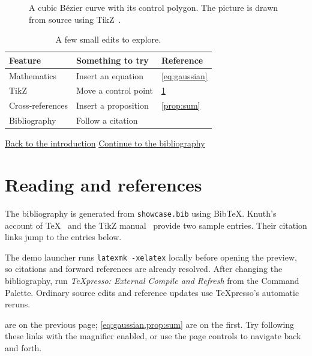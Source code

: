 \documentclass{article}
\begin{document}
\begin{figure}[ht]
\centering
{}
\caption{A cubic B\'ezier curve with its control polygon. The picture is drawn
from source using TikZ~\cite{tikz}.}\label{fig:curve}
\end{figure}

\begin{table}[ht]
\centering
\begin{tabular}{lll}
\toprule
Feature & Something to try & Reference \\
\midrule
Mathematics & Insert an equation & \cref{eq:gaussian} \\
TikZ & Move a control point & \cref{fig:curve} \\
Cross-references & Insert a proposition & \cref{prop:sum} \\
Bibliography & Follow a citation & \cite{knuth1984} \\
\bottomrule
\end{tabular}
\caption{A few small edits to explore.}\label{tab:checklist}
\end{table}

\noindent\hyperref[sec:start]{Back to the introduction}
\hfill\hyperref[sec:references]{Continue to the bibliography}

\newpage
\section{Reading and references}\label{sec:references}
The bibliography is generated from \texttt{showcase.bib} using BibTeX.
Knuth's account of \TeX~\cite{knuth1984} and the TikZ manual~\cite{tikz}
provide two sample entries. Their citation links jump to the entries below.

The demo launcher runs \texttt{latexmk -xelatex} locally before opening the
preview, so citations and forward references are already resolved.
After changing the bibliography, run
\emph{TeXpresso: External Compile and Refresh} from the Command Palette.
Ordinary source edits and reference updates use TeXpresso's automatic reruns.

 are on the previous page;
\cref{eq:gaussian,prop:sum} are on the first. Try following these links with the
magnifier enabled, or use the page controls to navigate back and forth.



\end{document}
